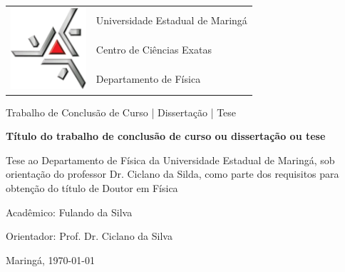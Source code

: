 \begin{titlepage}
	\begin{center}
		\begin{tabular}{m{4cm}m{10cm}}
			\multirow{3}{*}{\vspace{-0.5cm}\includegraphics[width=2.8cm]{fig/uem}}
			& {\LARGE Universidade Estadual de Maringá} \\
			& {\LARGE Centro de Ciências Exatas} \\
			& {\LARGE Departamento de Física} \\
		\end{tabular}
		\vspace{1.8cm}
	
		{\LARGE Trabalho de Conclusão de Curso | Dissertação | Tese}
		\vspace{4.0cm}

		{\LARGE {\bf Título do trabalho de conclusão de curso
ou dissertação ou tese}}
		\vfill

		\hspace*{7.0cm}\parbox{9.0cm}
		{\large Tese ao Departamento de
Física da Universidade Estadual de Maringá, sob orientação do professor
Dr. Ciclano da Silda, como parte dos requisitos para obtenção do título
de Doutor em Física}
		\vfill
	
		{\Large Acadêmico: Fulando da Silva}
		\vspace{0.8cm}
	
		{\Large Orientador: Prof. Dr. Ciclano da Silva}
		\vspace{1.2cm}
	
		{\large Maringá, \today}
	\end{center}
\end{titlepage}
